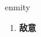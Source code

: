 
\begin{frame}
{\huge enmity}
\begin{center}
\begin{enumerate}\Large
  \item \textbf{敌意}
\end{enumerate}
\end{center}
\end{frame}
